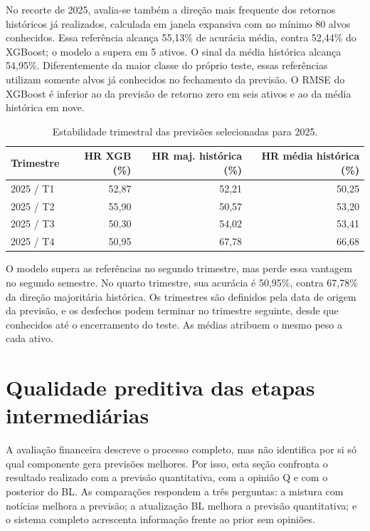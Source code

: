 No recorte de 2025, avalia-se também a direção mais frequente dos retornos históricos já realizados, calculada em janela expansiva com no mínimo 80 alvos conhecidos. Essa referência alcança 55,13\% de acurácia média, contra 52,44\% do XGBoost; o modelo a supera em 5 ativos. O sinal da média histórica alcança 54,95\%. Diferentemente da maior classe do próprio teste, essas referências utilizam somente alvos já conhecidos no fechamento da previsão. O RMSE do XGBoost é inferior ao da previsão de retorno zero em seis ativos e ao da média histórica em nove.

\begin{table}[H]\centering
\caption{Estabilidade trimestral das previsões selecionadas para 2025.}
\label{tab:xgb_estabilidade}
{\footnotesize\setlength{\tabcolsep}{4pt}\begin{tabular}{lrrr}\hline
Trimestre & HR XGB (\%) & HR maj. histórica (\%) & HR média histórica (\%)\\ \hline
2025 / T1 & 52,87 & 52,21 & 50,25\\
2025 / T2 & 55,90 & 50,57 & 53,20\\
2025 / T3 & 50,30 & 54,02 & 53,41\\
2025 / T4 & 50,95 & 67,78 & 66,68\\
\hline\end{tabular}}
\par{}
\end{table}

O modelo supera as referências no segundo trimestre, mas perde essa vantagem no segundo semestre. No quarto trimestre, sua acurácia é 50,95\%, contra 67,78\% da direção majoritária histórica. Os trimestres são definidos pela data de origem da previsão, e os desfechos podem terminar no trimestre seguinte, desde que conhecidos até o encerramento do teste. As médias atribuem o mesmo peso a cada ativo.

\section{Qualidade preditiva das etapas intermediárias}

\label{sec:etapas_preditivas}

A avaliação financeira descreve o processo completo, mas não identifica por si só qual componente gera previsões melhores. Por isso, esta seção confronta o resultado realizado com a previsão quantitativa, com a opinião Q e com o posterior do BL. As comparações respondem a três perguntas: a mistura com notícias melhora a previsão; a atualização BL melhora a previsão quantitativa; e o sistema completo acrescenta informação frente ao prior sem opiniões.


